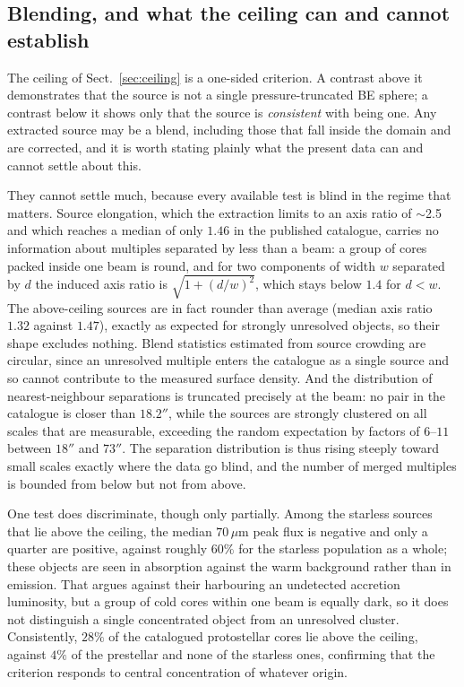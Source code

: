 \documentclass[11pt,a4paper]{article}
\begin{document}
\subsection{Blending, and what the ceiling can and cannot establish}
\label{sec:blending}

The ceiling of Sect.~\ref{sec:ceiling} is a one-sided criterion. A contrast
above it demonstrates that the source is not a single pressure-truncated BE
sphere; a contrast below it shows only that the source is \emph{consistent}
with being one. Any extracted source may be a blend, including those that fall
inside the domain and are corrected, and it is worth stating plainly what the
present data can and cannot settle about this.

They cannot settle much, because every available test is blind in the regime
that matters. Source elongation, which the extraction limits to an axis ratio
of $\sim$2.5 and which reaches a median of only $1.46$ in the published
catalogue, carries no information about multiples separated by less than a
beam: a group of cores packed inside one beam is round, and for two components
of width $w$ separated by $d$ the induced axis ratio is
$\sqrt{1+(d/w)^{2}}$, which stays below $1.4$ for $d<w$. The above-ceiling
sources are in fact rounder than average (median axis ratio $1.32$ against
$1.47$), exactly as expected for strongly unresolved objects, so their shape
excludes nothing. Blend statistics estimated from source crowding are
circular, since an unresolved multiple enters the catalogue as a single
source and so cannot contribute to the measured surface density. And the
distribution of nearest-neighbour separations is truncated precisely at the
beam: no pair in the catalogue is closer than $18.2''$, while the sources are
strongly clustered on all scales that are measurable, exceeding the random
expectation by factors of $6$--$11$ between $18''$ and $73''$. The separation
distribution is thus rising steeply toward small scales exactly where the data
go blind, and the number of merged multiples is bounded from below but not
from above.

One test does discriminate, though only partially. Among the starless sources
that lie above the ceiling, the median $70\,\mu$m peak flux is negative and
only a quarter are positive, against roughly $60\%$ for the starless
population as a whole; these objects are seen in absorption against the warm
background rather than in emission. That argues against their harbouring an
undetected accretion luminosity, but a group of cold cores within one beam is
equally dark, so it does not distinguish a single concentrated object from an
unresolved cluster. Consistently, $28\%$ of the catalogued protostellar cores
lie above the ceiling, against $4\%$ of the prestellar and none of the
starless ones, confirming that the criterion responds to central concentration
of whatever origin.
\end{document}
